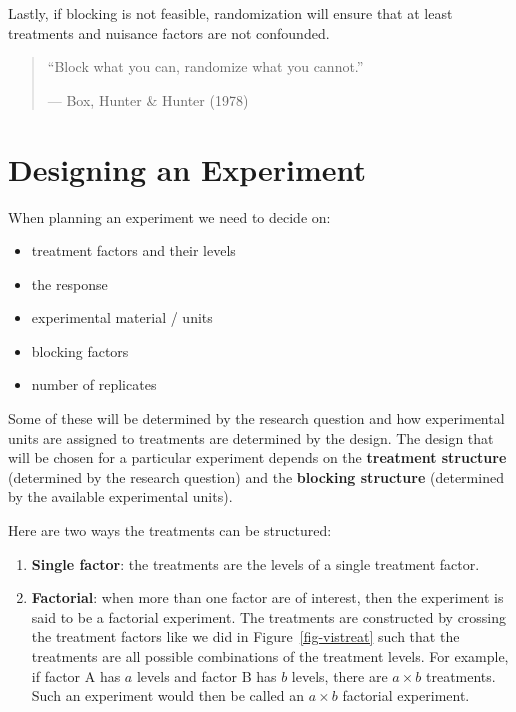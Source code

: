 \documentclass[
  letterpaper,
]{book}
\providecommand{\tightlist}{%
  \setlength{\itemsep}{0pt}\setlength{\parskip}{0pt}}\usepackage{longtable,booktabs,array}
\begin{document}
Lastly, if blocking is not feasible, randomization will ensure that at
least treatments and nuisance factors are not confounded.

\begin{quote}
``Block what you can, randomize what you cannot.''

--- Box, Hunter \& Hunter (1978)
\end{quote}

\chapter{Designing an Experiment}\label{designing-an-experiment}

When planning an experiment we need to decide on:

\begin{itemize}
\tightlist
\item
  treatment factors and their levels
\item
  the response
\item
  experimental material / units
\item
  blocking factors
\item
  number of replicates
\end{itemize}

Some of these will be determined by the research question and how
experimental units are assigned to treatments are determined by the
design. The design that will be chosen for a particular experiment
depends on the \textbf{treatment structure} (determined by the research
question) and the \textbf{blocking structure} (determined by the
available experimental units).

Here are two ways the treatments can be structured:

\begin{enumerate}
\def\labelenumi{\arabic{enumi}.}
\tightlist
\item
  \textbf{Single factor}: the treatments are the levels of a single
  treatment factor.
\item
  \textbf{Factorial}: when more than one factor are of interest, then
  the experiment is said to be a factorial experiment. The treatments
  are constructed by crossing the treatment factors like we did in
  Figure~\ref{fig-vistreat} such that the treatments are all possible
  combinations of the treatment levels. For example, if factor A has
  \(a\) levels and factor B has \(b\) levels, there are \(a \times b\)
  treatments. Such an experiment would then be called an \(a \times b\)
  factorial experiment.
\end{enumerate}
\end{document}
